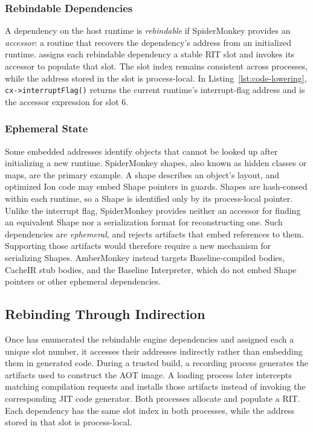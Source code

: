 \documentclass[sigplan,screen,review,anonymous]{acmart}
\newcommand{\AM}{\leavevmode{\sc AmberMonkey}}
\begin{document}
\subsubsection{Rebindable Dependencies}

A dependency on the host runtime is \emph{rebindable} if SpiderMonkey provides an \emph{accessor}: a routine that recovers the dependency's address from an initialized runtime. \AM{} assigns each rebindable dependency a stable RIT slot and invokes its accessor to populate that slot. The slot index remains consistent across processes, while the address stored in the slot is process-local. In Listing~\ref{lst:code-lowering}, \texttt{cx->interruptFlag()} returns the current runtime's interrupt-flag address and is the accessor expression for slot 6.

\subsubsection{Ephemeral State}

Some embedded addresses identify objects that cannot be looked up after initializing a new runtime. SpiderMonkey shapes, also known as hidden classes or maps, are the primary example. A shape describes an object's layout, and optimized Ion code may embed Shape pointers in guards. Shapes are hash-consed within each runtime, so a Shape is identified only by its process-local pointer. Unlike the interrupt flag, SpiderMonkey provides neither an accessor for finding an equivalent Shape nor a serialization format for reconstructing one. Such dependencies are \emph{ephemeral}, and \AM{} rejects artifacts that embed references to them. Supporting those artifacts would therefore require a new mechanism for serializing Shapes. AmberMonkey instead targets Baseline-compiled bodies, CacheIR stub bodies, and the Baseline Interpreter, which do not embed Shape pointers or other ephemeral dependencies.

\subsection{Rebinding Through Indirection}

Once \AM{} has enumerated the rebindable engine dependencies and assigned each a unique slot number, it accesses their addresses indirectly rather than embedding them in generated code. During a trusted build, a recording process generates the artifacts used to construct the AOT image. A loading process later intercepts matching compilation requests and installs those artifacts instead of invoking the corresponding JIT code generator. Both processes allocate and populate a RIT. Each dependency has the same slot index in both processes, while the address stored in that slot is process-local. 
\end{document}
